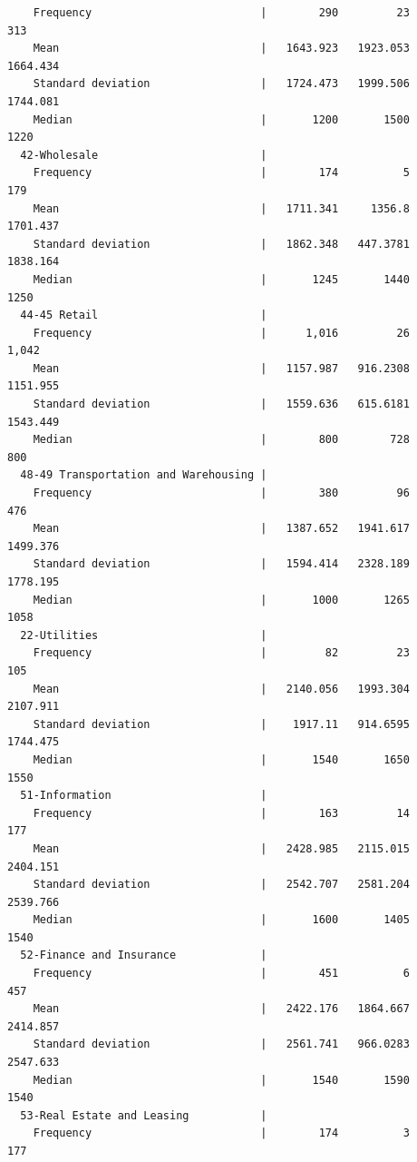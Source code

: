 \documentclass[
]{book}
\begin{document}
\begin{verbatim}
    Frequency                          |        290         23        313
    Mean                               |   1643.923   1923.053   1664.434
    Standard deviation                 |   1724.473   1999.506   1744.081
    Median                             |       1200       1500       1220
  42-Wholesale                         |                                 
    Frequency                          |        174          5        179
    Mean                               |   1711.341     1356.8   1701.437
    Standard deviation                 |   1862.348   447.3781   1838.164
    Median                             |       1245       1440       1250
  44-45 Retail                         |                                 
    Frequency                          |      1,016         26      1,042
    Mean                               |   1157.987   916.2308   1151.955
    Standard deviation                 |   1559.636   615.6181   1543.449
    Median                             |        800        728        800
  48-49 Transportation and Warehousing |                                 
    Frequency                          |        380         96        476
    Mean                               |   1387.652   1941.617   1499.376
    Standard deviation                 |   1594.414   2328.189   1778.195
    Median                             |       1000       1265       1058
  22-Utilities                         |                                 
    Frequency                          |         82         23        105
    Mean                               |   2140.056   1993.304   2107.911
    Standard deviation                 |    1917.11   914.6595   1744.475
    Median                             |       1540       1650       1550
  51-Information                       |                                 
    Frequency                          |        163         14        177
    Mean                               |   2428.985   2115.015   2404.151
    Standard deviation                 |   2542.707   2581.204   2539.766
    Median                             |       1600       1405       1540
  52-Finance and Insurance             |                                 
    Frequency                          |        451          6        457
    Mean                               |   2422.176   1864.667   2414.857
    Standard deviation                 |   2561.741   966.0283   2547.633
    Median                             |       1540       1590       1540
  53-Real Estate and Leasing           |                                 
    Frequency                          |        174          3        177

\end{verbatim}
\end{document}
